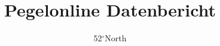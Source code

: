 \documentclass{article}
\begin{document}




\title{Pegelonline Datenbericht}
\author{52$^\circ$North}
\maketitle







\end{document}
